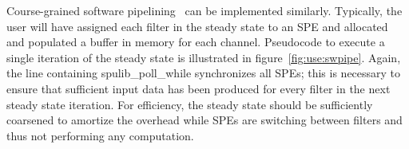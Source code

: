 Course-grained software pipelining~\cite{asplos06} can be implemented similarly. Typically, the user will have assigned each filter in the steady state to an SPE and allocated and populated a buffer in memory for each channel. Pseudocode to execute a single iteration of the steady state is illustrated in figure~\ref{fig:use:swpipe}. Again, the line containing \textsf{spulib\_poll\_while} synchronizes all SPEs; this is necessary to ensure that sufficient input data has been produced for every filter in the next steady state iteration. For efficiency, the steady state should be sufficiently coarsened to amortize the overhead while SPEs are switching between filters and thus not performing any computation.

\begin{figure}[!htb]
\begin{center}
\begin{tabular}{ll}

\end{tabular}
\end{center}
\end{figure}

